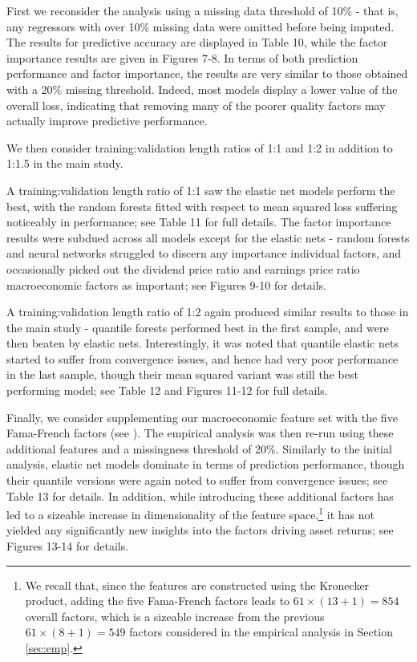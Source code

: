 \documentclass{article}
\begin{document}
First we reconsider the analysis using a missing data threshold of 10\% - that is, any regressors with over 10\% missing data were omitted before being imputed. The results for predictive accuracy are displayed in Table 10, while the factor importance results are given in Figures 7-8. In terms of both prediction performance and factor importance, the results are very similar to those obtained with a 20\% missing threshold. Indeed, most models display a lower value of the overall loss, indicating that removing many of the poorer quality factors may actually improve predictive performance.

We then consider training:validation length ratios of 1:1 and 1:2 in addition to 1:1.5 in the main study. 

A training:validation length ratio of 1:1 saw the elastic net models perform the best, with the random forests fitted with respect to mean squared loss suffering noticeably in performance; see Table 11 for full details. The factor importance results were subdued across all models except for the elastic nets - random forests and neural networks struggled to discern any importance individual factors, and occasionally picked out the dividend price ratio and earnings price ratio macroeconomic factors as important; see Figures 9-10 for details. 

A training:validation length ratio of 1:2 again produced similar results to those in the main study - quantile forests performed best in the first sample, and were then beaten by elastic nets. Interestingly, it was noted that quantile elastic nets started to suffer from convergence issues, and hence had very poor performance in the last sample, though their mean squared variant was still the best performing model; see Table 12 and Figures 11-12 for full details. 

Finally, we consider supplementing our macroeconomic feature set with the five Fama-French factors (see \cite{fama_five-factor_2015}). The empirical analysis was then re-run using these additional features and a missingness threshold of 20\%. Similarly to the initial analysis, elastic net models dominate in terms of prediction performance, though their quantile versions were again noted to suffer from convergence issues; see Table 13 for details. In addition, while introducing these additional factors has led to a sizeable increase in dimensionality of the feature space,\footnote{We recall that, since the features are constructed using the Kronecker product, adding the five Fama-French factors leads to $61\times(13+1)=854$ overall factors, which is a sizeable increase from the previous $61\times(8+1)=549$ factors considered in the empirical analysis in Section \ref{sec:emp}.} it has not yielded any significantly new insights into the factors driving asset returns; see Figures 13-14 for details.  

\end{document}
